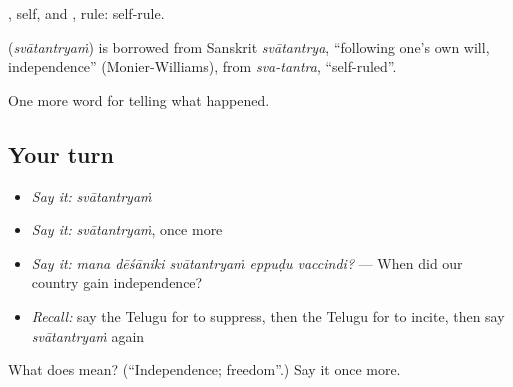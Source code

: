 , self, and , rule: self-rule.

\begin{cousinweb}
\textbf{} (\emph{svātantryaṁ}) is borrowed from Sanskrit \emph{svātantrya}, \textquotedblleft{}following one's own will, independence\textquotedblright{} (Monier-Williams), from \emph{sva-tantra}, \textquotedblleft{}self-ruled\textquotedblright{}.
\end{cousinweb}

\begin{grammarlens}[title={What you've built}]
One more word for telling what happened.
\end{grammarlens}

\subsection*{Your turn}
\begin{itemize}
\raggedright
  \item \emph{Say it:} \emph{svātantryaṁ}
  \item \emph{Say it:} \emph{svātantryaṁ}, once more
  \item \emph{Say it:} \emph{mana dēśāniki svātantryaṁ eppuḍu vaccindi?} — When did our country gain independence?
  \item \emph{Recall:} say the Telugu for to suppress, then the Telugu for to incite, then say \emph{svātantryaṁ} again
\end{itemize}

\begin{tcolorbox}[breakable,colback=teal!4,colframe=teal!35!black,title={Before you move on}]
What does  mean? (\textquotedblleft{}Independence; freedom\textquotedblright{}.) Say it once more.
\end{tcolorbox}
